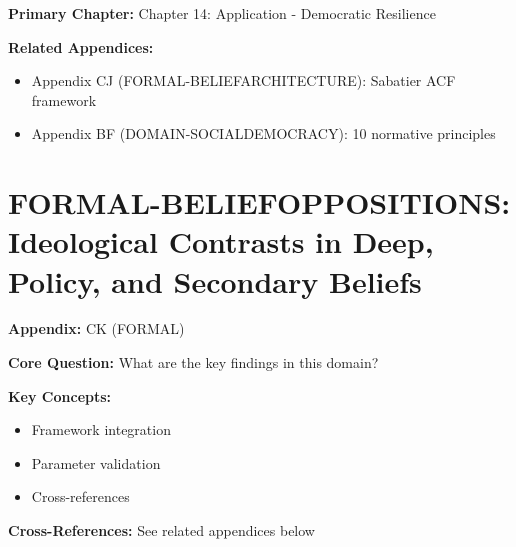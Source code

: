 %
%

\begin{tcolorbox}[colback=purple!5!white, colframe=purple!75!black,
    title=Chapter Linkage]

\textbf{Primary Chapter:} Chapter 14: Application - Democratic Resilience

\textbf{Related Appendices:}
\begin{itemize}[nosep]
\item Appendix CJ (FORMAL-BELIEFARCHITECTURE): Sabatier ACF framework
\item Appendix BF (DOMAIN-SOCIALDEMOCRACY): 10 normative principles
\end{itemize}

\end{tcolorbox}


\chapter{FORMAL-BELIEFOPPOSITIONS: Ideological Contrasts in Deep, Policy, and Secondary Beliefs}
\label{app:ck-beliefoppositions}


\begin{tcolorbox}[colback=blue!5!white, colframe=blue!75!black,
    title=Quick Reference: Appendix CK]

\textbf{Appendix:} CK (FORMAL)

\textbf{Core Question:} What are the key findings in this domain?

\textbf{Key Concepts:}
\begin{itemize}[nosep]
\item Framework integration
\item Parameter validation
\item Cross-references
\end{itemize}

\textbf{Cross-References:} See related appendices below
\end{tcolorbox}

